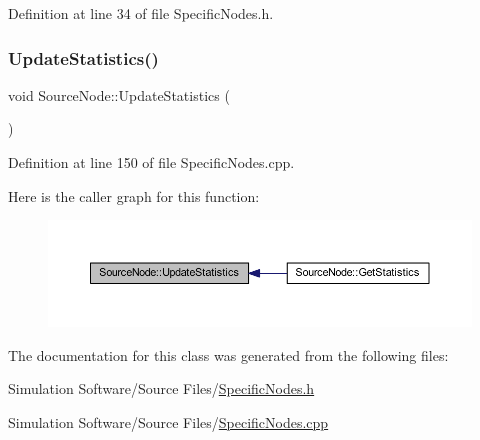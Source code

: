 Definition at line 34 of file Specific\+Nodes.\+h.

\mbox{\label{class_source_node_a6c5037fd886362d56b7ce04094433510}} 
\subsubsection{\texorpdfstring{Update\+Statistics()}{UpdateStatistics()}}
{\footnotesize\ttfamily void Source\+Node\+::\+Update\+Statistics (\begin{DoxyParamCaption}{ }\end{DoxyParamCaption})}



Definition at line 150 of file Specific\+Nodes.\+cpp.

Here is the caller graph for this function\+:
\nopagebreak
\begin{figure}[H]
\begin{center}
\leavevmode
\includegraphics[width=350pt]{class_source_node_a6c5037fd886362d56b7ce04094433510_icgraph}
\end{center}
\end{figure}


The documentation for this class was generated from the following files\+:\begin{DoxyCompactItemize}
\item 
Simulation Software/\+Source Files/\hyperlink{_specific_nodes_8h}{Specific\+Nodes.\+h}\item 
Simulation Software/\+Source Files/\hyperlink{_specific_nodes_8cpp}{Specific\+Nodes.\+cpp}\end{DoxyCompactItemize}
